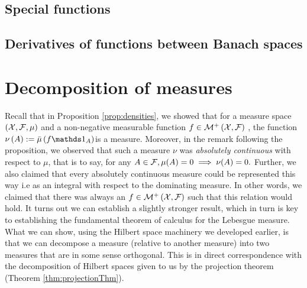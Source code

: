 \subsection{Special functions\label{sec:specialFunctions}}

\subsection{Derivatives of functions between Banach spaces}

\section{Decomposition of measures}

Recall that in Proposition \ref{prop:densities}, we showed that for
a measure space $\left(\mathcal{X},\mathcal{F},\mu\right)$ and a non-negative measurable
function $f\in\mathcal{M}^{+}\left(\mathcal{X},\mathcal{F}\right)$ , the function $\nu\left(A\right):=\lebInt{\mu}{f\indicate_{A}}$is
a measure. Moreover, in the remark following the proposition, we observed
that such a measure $\nu$ was \emph{absolutely continuous }with respect
to $\mu$, that is to say, for any $A\in\mathcal{F},\mu(A)=0\implies\nu(A)=0.$
Further, we also claimed that every absolutely continuous measure
could be represented this way i.e as an integral with respect to the
dominating measure. In other words, we claimed that there was always
an $f\in\mathcal{M}^{+}\left(\mathcal{X},\mathcal{F}\right)$ such that this relation would
hold. It turns out we can establish a slightly stronger result, which
in turn is key to establishing the fundamental theorem of calculus
for the Lebesgue measure. What we can show, using the Hilbert space
machinery we developed earlier, is that we can decompose a measure
(relative to another measure) into two measures that are in some sense
orthogonal. This is in direct correspondence with the decomposition
of Hilbert spaces given to us by the projection theorem (Theorem \ref{thm:projectionThm}).

